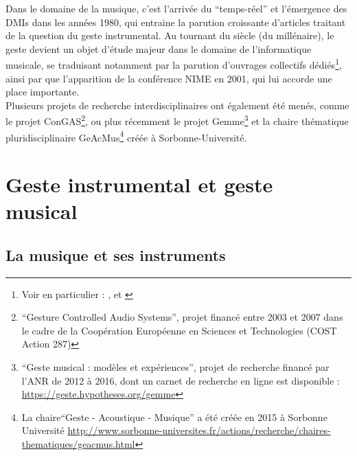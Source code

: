 \indent Dans le domaine de la musique, c'est l'arrivée du ``temps-réel'' et l'émergence des \glspl{DMI} dans les années 1980, qui entraine la parution croissante d'articles traitant de la question du geste instrumental. Au tournant du siècle (du millénaire), le geste devient un objet d'étude majeur dans le domaine de l'informatique musicale, se traduisant notamment par la parution d'ouvrages collectifs dédiés\footnote{Voir en particulier : \cite{genevois_les_1999}, \cite{wanderley_trends_2000} et \cite{godoy_musical_2010}}, ainsi par que l'apparition de la conférence \gls{NIME} en 2001, qui lui accorde une place importante.\\
\indent Plusieurs projets de recherche interdisciplinaires ont également été menés, comme le projet ConGAS\footnote{``Gesture Controlled Audio Systems'', projet financé entre 2003 et 2007 dans le cadre de la Coopération Européenne en Sciences et Technologies (COST Action 287)}, ou plus récemment le projet Gemme\footnote{``Geste musical : modèles et expériences'', projet de recherche financé par l'ANR de 2012 à 2016, dont un carnet de recherche en ligne est disponible : \url{https://geste.hypotheses.org/gemme}} et la chaire thématique pluridisciplinaire GeAcMus\footnote{La chaire``Geste - Acoustique - Musique'' a été créée en 2015 à Sorbonne Université \url{http://www.sorbonne-universites.fr/actions/recherche/chaires-thematiques/geacmus.html}} créée à Sorbonne-Université.



\section{Geste instrumental et geste musical}

\subsection{La musique et ses instruments}

